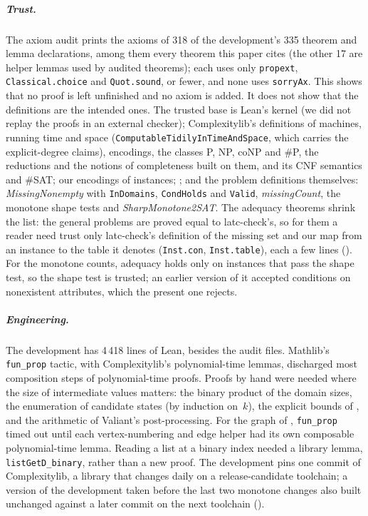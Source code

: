 \documentclass[a4paper,UKenglish,cleveref,autoref,thm-restate]{lipics-v2021}
\begin{document}
\subparagraph*{Trust.}
The axiom audit prints the axioms of 318 of the development's 335 theorem and lemma declarations,
among them every theorem this paper cites (the other 17 are helper lemmas used by audited
theorems); each uses only \lstinline{propext}, \lstinline{Classical.choice} and \lstinline{Quot.sound}, or
fewer, and none uses \lstinline{sorryAx}. This shows that no proof is left unfinished and no
axiom is added. It does not show that the definitions are the intended ones. The trusted base is
Lean's kernel (we did not replay the proofs in an external checker); Complexitylib's definitions
of machines, running time and space (\lstinline{ComputableTidilyInTimeAndSpace}, which carries
the explicit-degree claims), encodings, the classes P, NP, coNP and \#P, the reductions and the
notions of completeness built on them, and its CNF semantics and \#SAT; our encodings of
instances; ; and the problem definitions themselves:
\textit{MissingNonempty} with \lstinline{InDomains}, \lstinline{CondHolds} and
\lstinline{Valid}, \textit{missingCount}, the monotone shape tests and
\textit{SharpMonotone2SAT}. The adequacy theorems shrink the list: the general problems are
proved equal to latc-check's, so for them a reader need trust only latc-check's definition of the
missing set and our map from an instance to the table it denotes (\lstinline{Inst.con},
\lstinline{Inst.table}), each a few lines
(). For the monotone counts, adequacy holds only on instances that
pass the shape test, so the shape test is trusted; an earlier version of it accepted conditions on
nonexistent attributes, which the present one rejects.

\subparagraph*{Engineering.}
The development has 4\,418 lines of Lean, besides the audit files. Mathlib's
\lstinline{fun_prop} tactic, with Complexitylib's polynomial-time lemmas, discharged most composition steps of polynomial-time proofs. Proofs by hand
were needed where the size of intermediate values matters: the binary product of the domain
sizes, the enumeration of candidate states (by induction on~$k$), the explicit bounds of
, and the arithmetic of Valiant's post-processing. For the graph of
, \lstinline{fun_prop} timed out until each vertex-numbering and edge helper
had its own composable polynomial-time lemma. Reading a list at a binary index needed a library
lemma, \lstinline{listGetD_binary}, rather than a new proof. The development pins one commit of
Complexitylib, a library that changes daily on a release-candidate toolchain; a version of the
development taken before the last two monotone changes also built unchanged against a later
commit on the next toolchain ().
\end{document}
